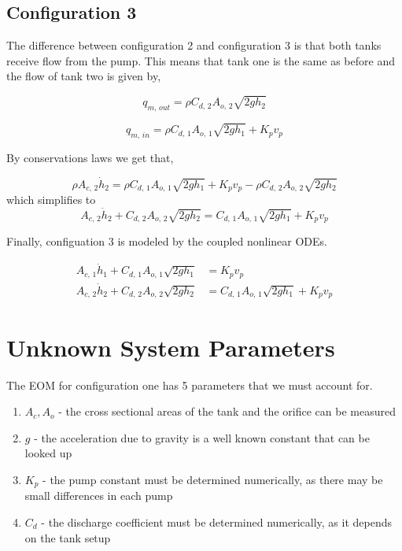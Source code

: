 \documentclass[12pt]{article}
\numberwithin{equation}{subsection}
\begin{document}
  \subsection{Configuration 3}

  The difference between configuration 2 and configuration 3 is that both tanks receive flow from the pump. This means that tank one is the same as before and the flow of tank two is given by,

  \begin{equation}
    q_{m, \, out} = \rho C_{d, \, 2} A_{o, \, 2}  \sqrt{2gh_2}
  \end{equation}

  \begin{equation}
    q_{m, \, in} = \rho C_{d, \, 1} A_{o, \, 1}  \sqrt{2gh_1} + K_pv_p
  \end{equation}

  By conservations laws we get that,

  \begin{equation}
    \rho A_{c, \, 2} \dot h_2 = \rho C_{d, \, 1} A_{o, \, 1}  \sqrt{2gh_1} + K_pv_p - \rho C_{d, \, 2} A_{o, \, 2}  \sqrt{2gh_2}
  \end{equation}
  which simplifies to
  \begin{equation}
      A_{c, \, 2} \dot h_2 + C_{d, \, 2} A_{o, \, 2}  \sqrt{2gh_2} = C_{d, \, 1} A_{o, \, 1}  \sqrt{2gh_1} + K_pv_p
  \end{equation}

  Finally, configuation 3 is modeled by the coupled nonlinear ODEs.

  \begin{equation}
    \begin{aligned}
      A_{c, \, 1} \dot h_1 +  C_{d, \, 1} A_{o, \, 1} \sqrt{2gh_1} &= K_p v_p \\
      A_{c, \, 2} \dot h_2 + C_{d, \, 2} A_{o, \, 2}  \sqrt{2gh_2} &= C_{d, \, 1} A_{o, \, 1}  \sqrt{2gh_1} + K_pv_p
    \end{aligned}
  \end{equation}

  \section{Unknown System Parameters}

  The EOM for configuration one has 5 parameters that we must account for.

  \begin{enumerate}
    \item $ A_c, A_o $ - the cross sectional areas of the tank and the orifice can be measured
    \item $ g $ - the acceleration due to gravity is a well known constant that can be looked up
    \item $ K_p $ - the pump constant must be determined numerically, as there may be small differences in each pump
    \item $ C_d $ - the discharge coefficient must be determined numerically, as it depends on the tank setup
  \end{enumerate}
\end{document}
